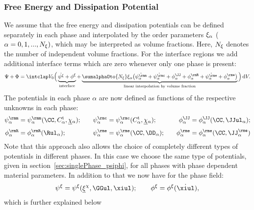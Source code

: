 \subsubsection{Free Energy and Dissipation Potential} %
We assume that the free energy and dissipation potentials can be defined separately in each phase and interpolated by the order parameters $\xi_\alpha$ ($\alpha=0,1,...,N_{\xi})$, which may be interpreted as volume fractions. Here, $N_{\xi}$ denotes the number of independent volume fractions. For the interface regions we add additional interface terms which are zero whenever only one phase is present:
  \begin{align}
    \begin{split}
      \Psi+\Phi = \intVO \Big(\underbrace{\dot\psixi+\phixi \vphantom{\sumalphaOto{\Nxi}}}_{\text{interface}} 
          + \underbrace{ \sumalphaOto{\Nxi} \xia\big( \dot\psima + \dot\psica+\phiJJa+\phiRa+\dot\psiea+\phiea \big)
          }_{\text{linear interpolation by volume fraction}} \Big) \dV.
    \end{split}  
  \end{align}
  The potentials in each phase $\alpha$ are now defined as functions of the respective unknowns in each phase:
  \begin{align}
    \begin{alignedat}{3}
      \psima &= \psima(\CC,\Cta,\chiula);& \qquad \psica &=\psica(\Cta,\chiula); &\qquad \phiJJa &= \phiJJa(\CC,\JJula); \\[3pt]
      \phiRa &= \phiRa(\Rula);& \qquad \psiea&=\psiea(\CC,\DDa); &\qquad \phiea&=\phiea(\CC,\JJea)
    \end{alignedat}
  \end{align}
  Note that this approach also allows the choice of completely different types of potentials in different phases. In this case we choose the same type of potentials, given in section~\ref{sec:singlePhase_psiphi}, for all phases with phase dependent material parameters. In addition to that we now have for the phase field: 
  \begin{align}
    \psixi=\psixi(\xichiul,\GGul,\xiul); \qquad \phixi=\phixi(\dot\xiul),
  \end{align}
  which is further explained below

